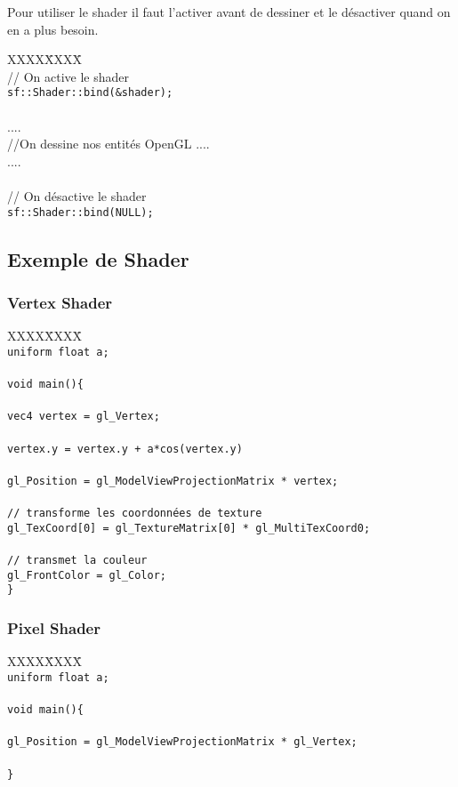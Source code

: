 Pour utiliser le shader il faut l'activer avant de dessiner et le désactiver quand on en a plus besoin.


\begin{tabbing}
XXXX\=XXXX\= \kill\\
\> // On active le shader\\
\> \verb|sf::Shader::bind(&shader);|\\
\\
\> ....\\
\> //On dessine nos entités OpenGL ....\\
\> ....\\
\\
\> // On désactive le shader\\
\> \verb|sf::Shader::bind(NULL);|\\
\end{tabbing}

\subsection{Exemple de Shader}
\subsubsection{Vertex Shader}

\begin{tabbing}
XXXX\=XXXX\= \kill\\
\> \verb|uniform float a;|\\
\> \\
\> \verb|void main(){|\\
\> \\
\>\> \verb|vec4 vertex = gl_Vertex;| \\
\> \\
\>\> \verb|vertex.y = vertex.y + a*cos(vertex.y)| \\
\> \\
\>\> \verb|gl_Position = gl_ModelViewProjectionMatrix * vertex;|\\
\> \\
\>\> \verb|// transforme les coordonnées de texture|\\
\>\> \verb|gl_TexCoord[0] = gl_TextureMatrix[0] * gl_MultiTexCoord0;|\\
\> \\
\>\> \verb|// transmet la couleur|\\
\>\> \verb|gl_FrontColor = gl_Color;|\\
\> \verb|}|\\
\end{tabbing}


\subsubsection{Pixel Shader}

\begin{tabbing}
XXXX\=XXXX\= \kill\\
\> \verb|uniform float a;| \\
\> \\
\> \verb|void main(){|\\
\> \\
\> \verb|gl_Position = gl_ModelViewProjectionMatrix * gl_Vertex;|\\
\> \\
\> \verb|}|\\
\end{tabbing}